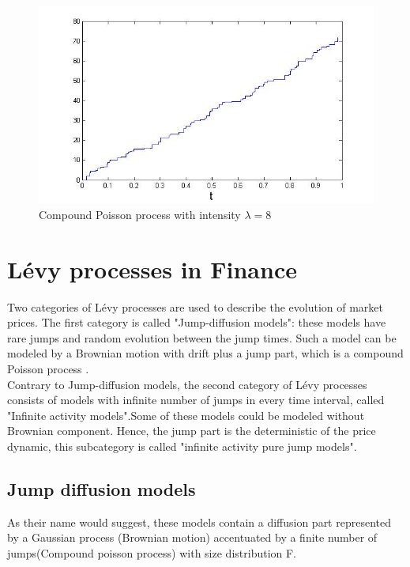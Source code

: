 \documentclass[12pt]{report}
\begin{document}
\begin{figure}[h]

\centering
\includegraphics[scale=0.7]{compoisson.jpg} 
\caption{Compound Poisson process with intensity $\lambda=8$}
\end{figure}

\section{Lévy processes in Finance}

Two categories of Lévy processes are used to describe the evolution of market prices. 
The first category is called "Jump-diffusion models": these models have rare jumps and random evolution between the jump times. Such a model can be modeled by a Brownian motion with drift plus a jump part, which is a compound Poisson process .\\

Contrary to Jump-diffusion models, the second category of Lévy processes consists of models with infinite number of jumps in every time interval, called "Infinite activity models".Some of these models could be modeled without Brownian component. Hence, the jump part is the deterministic of the price dynamic, this subcategory is called "infinite activity pure jump models". 
\subsection{Jump diffusion models}
As their name would suggest, these models contain  a diffusion part represented by a Gaussian process (Brownian motion) accentuated by a finite number of jumps(Compound poisson process) with size distribution F.      \\
\end{document}
